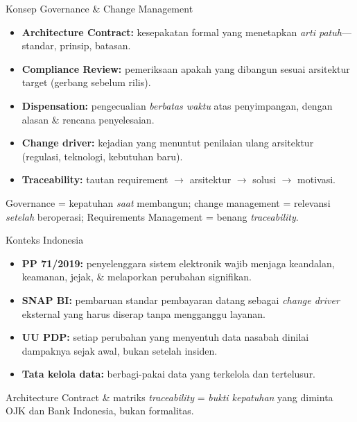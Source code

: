 \documentclass[aspectratio=169, table]{beamer}
\newcommand{\takeaway}[1]{%
  \vspace{4pt}
  {\footnotesize #1}
}
\begin{document}
\begin{frame}{Konsep Governance \& Change Management}
  \vspace{4pt}
  \footnotesize
  \begin{itemize}\setlength{\itemsep}{2.5pt}
    \item \textbf{Architecture Contract:} kesepakatan formal yang menetapkan
          \emph{arti patuh}---standar, prinsip, batasan.
    \item \textbf{Compliance Review:} pemeriksaan apakah yang dibangun sesuai
          arsitektur target (gerbang sebelum rilis).
    \item \textbf{Dispensation:} pengecualian \emph{berbatas waktu} atas
          penyimpangan, dengan alasan \& rencana penyelesaian.
    \item \textbf{Change driver:} kejadian yang menuntut penilaian ulang
          arsitektur (regulasi, teknologi, kebutuhan baru).
    \item \textbf{Traceability:} tautan requirement $\rightarrow$ arsitektur
          $\rightarrow$ solusi $\rightarrow$ motivasi.
  \end{itemize}
  \takeaway{Governance = kepatuhan \emph{saat} membangun; change management =
  relevansi \emph{setelah} beroperasi; Requirements Management = benang
  \emph{traceability}.}
\end{frame}

\begin{frame}{Konteks Indonesia}
  \vspace{6pt}
  \begin{itemize}
    \item \textbf{PP 71/2019:} penyelenggara sistem elektronik wajib menjaga
          keandalan, keamanan, jejak, \& melaporkan perubahan signifikan.
    \item \textbf{SNAP BI:} pembaruan standar pembayaran datang sebagai
          \emph{change driver} eksternal yang harus diserap tanpa mengganggu layanan.
    \item \textbf{UU PDP:} setiap perubahan yang menyentuh data nasabah dinilai
          dampaknya sejak awal, bukan setelah insiden.
    \item \textbf{Tata kelola data:} berbagi-pakai data yang terkelola dan
          tertelusur.
  \end{itemize}
  \takeaway{Architecture Contract \& matriks \emph{traceability} = \emph{bukti
  kepatuhan} yang diminta OJK dan Bank Indonesia, bukan formalitas.}
\end{frame}
\end{document}
